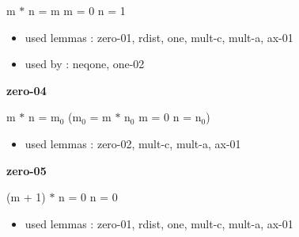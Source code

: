 \documentclass[a4paper]{article}
\begin{document}
 \Fol m $*$ n = m \Equiv m = 0 \Or n = 1

\begin{itemize}


\item       used lemmas  : zero-01, rdist, one, mult-c, mult-a, ax-01
\item       used by      : neqone, one-02

\end{itemize}

\medskip

\bigskip

{\large\bf zero-04}

\medskip

 \Fol m $*$ n = $\mbox{m}_{0}$ \Imp ($\mbox{m}_{0}$ = m $*$ $\mbox{n}_{0}$ \Equiv m = 0 \Or n = $\mbox{n}_{0}$)

\begin{itemize}


\item       used lemmas  : zero-02, mult-c, mult-a, ax-01

\end{itemize}

\medskip

\bigskip

{\large\bf zero-05}

\medskip

 \Fol (m + 1) $*$ n = 0 \Equiv n = 0

\begin{itemize}


\item       used lemmas  : zero-01, rdist, one, mult-c, mult-a, ax-01

\end{itemize}

\medskip
\end{document}
